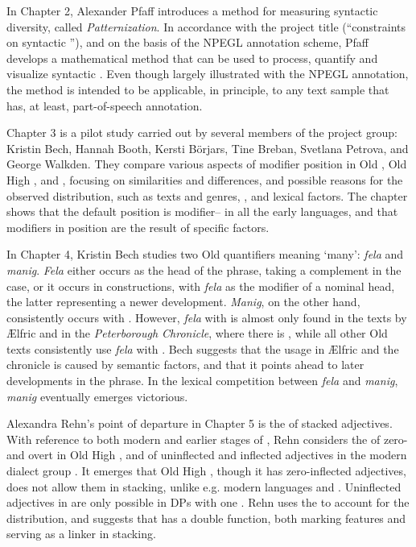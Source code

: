 \begin{refsection}
In Chapter 2, Alexander Pfaff introduces a method for measuring syntactic diversity, called \textit{Patternization}. In accordance with the project title (“constraints on syntactic ”), and on the basis of the NPEGL annotation scheme, Pfaff develops a mathematical method that can be used to process, quantify and visualize syntactic . Even though largely illustrated with the NPEGL annotation, the method is intended to be applicable, in principle, to any text sample that has, at least, part-of-speech annotation.   

Chapter 3 is a pilot study carried out by several members of the project group: Kristin Bech, Hannah Booth, Kersti Börjars, Tine Breban, Svetlana Petrova, and George Walkden. They compare various aspects of modifier position in Old , Old High ,  and , focusing on similarities and differences, and possible reasons for the observed distribution, such as texts and genres, , and lexical factors. The chapter shows that the default position is modifier-- in all the early  languages, and that modifiers in  position are the result of specific factors. 

In Chapter 4, Kristin Bech studies two Old  quantifiers meaning ‘many’: \textit{fela} and \textit{manig}. \textit{Fela} either occurs as the head of the  phrase, taking a  complement in the  case, or it occurs in  constructions, with \textit{fela} as the modifier of a nominal head, the latter representing a newer development. \textit{Manig}, on the other hand, consistently occurs with . However, \textit{fela} with  is almost only found in the texts by Ælfric and in the \textit{Peterborough Chronicle}, where there is , while all other Old  texts consistently use \textit{fela} with . Bech suggests that the usage in Ælfric and the chronicle is caused by semantic factors, and that it points ahead to later developments in the  phrase. In the lexical competition between \textit{fela} and \textit{manig}, \textit{manig} eventually emerges victorious. 

Alexandra Rehn’s point of departure in Chapter 5 is the  of stacked adjectives. With reference to both modern  and earlier stages of , Rehn considers the  of zero- and overt   in Old High , and of uninflected and inflected adjectives in the modern  dialect group . It emerges that Old High , though it has zero-inflected adjectives, does not allow them in stacking, unlike e.g. modern  languages and . Uninflected adjectives in  are only possible in DPs with one . Rehn uses the  to account for the distribution, and suggests that   has a double function, both marking features and serving as a linker in stacking.   


\end{refsection}
